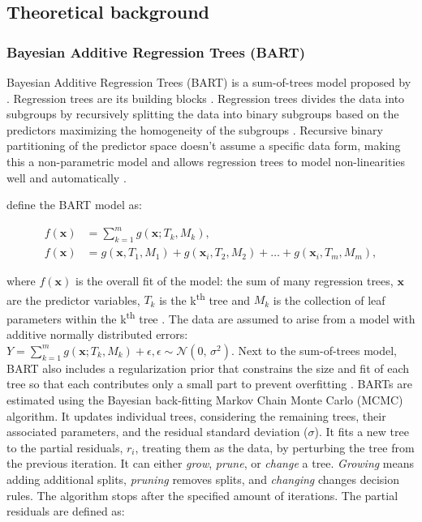 \documentclass[10pt, a4paper, titlepage]{article}
\begin{document}
\subsection{Theoretical background}
\subsubsection{Bayesian Additive Regression Trees (BART)}
Bayesian Additive Regression Trees (BART) is a sum-of-trees model proposed by \citet{chipman2010}. Regression trees are its building blocks \citep{chipman2010, hill2020, james2021}. Regression trees divides the data into subgroups by recursively splitting the data into binary subgroups based on the predictors maximizing the homogeneity of the subgroups \citep{hastie2017, james2021, salditt2023}. Recursive binary partitioning of the predictor space doesn't assume a specific data form, making this a non-parametric model \citep{hastie2017, james2021, salditt2023} and allows regression trees to model non-linearities well and automatically \citep{hill2020, burgette2010}.

\citet{chipman2010} define the BART model as:

\begin{subequations}
\label{eq:BART}
\begin{align}
f(\textbf{x}) &= \sum^{m}_{k=1}g(\textbf{x}; T_{k}, M_{k}), \tag{1.1} \\
f(\textbf{x}) &= g(\textbf{x}, T_{1}, M_{1}) + g(\textbf{x}_{i}, T_{2}, M_{2}) + \dots + g(\textbf{x}_{i}, T_{m}, M_{m}), \tag{1.2}
\end{align}
\end{subequations}

where $f(\mathbf{x})$ is the overall fit of the model: the sum of many regression trees, $\textbf{x}$ are the predictor variables, $T_{k}$ is the k\textsuperscript{th} tree and $M_{k}$ is the collection of leaf parameters within the k\textsuperscript{th} tree \citep{chipman2010, hill2020, james2021}. The data are assumed to arise from a model with additive normally distributed errors: $Y = \sum^{m}_{k=1}g(\textbf{x}; T_{k}, M_{k}) + \epsilon, \epsilon \sim \mathcal{N}(0,\,\sigma^{2})$.
Next to the sum-of-trees model, BART also includes a regularization prior that constrains the size and fit of each tree so that each contributes only a small part to prevent overfitting \citep{chipman2010, hill2020, james2021}. BARTs are estimated using the Bayesian back-fitting Markov Chain Monte Carlo (MCMC) algorithm. It updates individual trees, considering the remaining trees, their associated parameters, and the residual standard deviation ($\sigma$). It fits a new tree to the partial residuals, $r_{i}$, treating them as the data, by perturbing the tree from the previous iteration. It can either \textit{grow}, \textit{prune}, or \textit{change} a tree. \textit{Growing} means adding additional splits, \textit{pruning} removes splits, and \textit{changing} changes decision rules. The algorithm stops after the specified amount of iterations. The partial residuals are defined as:
\end{document}
